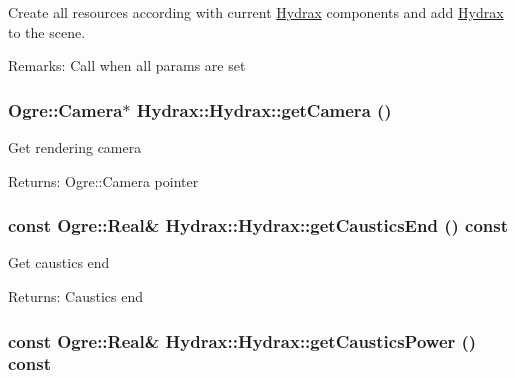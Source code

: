 Create all resources according with current \hyperlink{class_hydrax_1_1_hydrax}{Hydrax} components and add \hyperlink{class_hydrax_1_1_hydrax}{Hydrax} to the scene. \begin{Desc}
\item[Remarks:]Call when all params are set \end{Desc}
\hypertarget{class_hydrax_1_1_hydrax_ef185c906434b6dfb7c67a425d678287}{
\subsubsection[{getCamera}]{\setlength{\rightskip}{0pt plus 5cm}Ogre::Camera$\ast$ Hydrax::Hydrax::getCamera ()}}
\label{class_hydrax_1_1_hydrax_ef185c906434b6dfb7c67a425d678287}


Get rendering camera \begin{Desc}
\item[Returns:]Ogre::Camera pointer \end{Desc}
\hypertarget{class_hydrax_1_1_hydrax_608b120b0ee226cf85b1c5a1720f65a6}{
\subsubsection[{getCausticsEnd}]{\setlength{\rightskip}{0pt plus 5cm}const Ogre::Real\& Hydrax::Hydrax::getCausticsEnd () const}}
\label{class_hydrax_1_1_hydrax_608b120b0ee226cf85b1c5a1720f65a6}


Get caustics end \begin{Desc}
\item[Returns:]Caustics end \end{Desc}
\hypertarget{class_hydrax_1_1_hydrax_d857d60009cbc99335081bc65a25b719}{
\subsubsection[{getCausticsPower}]{\setlength{\rightskip}{0pt plus 5cm}const Ogre::Real\& Hydrax::Hydrax::getCausticsPower () const}}
\label{class_hydrax_1_1_hydrax_d857d60009cbc99335081bc65a25b719}


